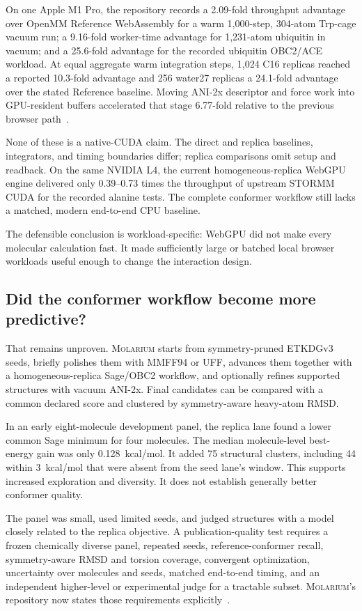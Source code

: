 \documentclass[11pt]{article}
\newcommand{\molarium}{\textnormal{\textsc{Molarium}}}
\begin{document}
On one Apple M1 Pro, the repository records a 2.09-fold throughput advantage over OpenMM Reference WebAssembly for a warm 1,000-step, 304-atom Trp-cage vacuum run; a 9.16-fold worker-time advantage for 1,231-atom ubiquitin in vacuum; and a 25.6-fold advantage for the recorded ubiquitin OBC2/ACE workload.
At equal aggregate warm integration steps, 1,024 C16 replicas reached a reported 10.3-fold advantage and 256 water27 replicas a 24.1-fold advantage over the stated Reference baseline.
Moving ANI-2x descriptor and force work into GPU-resident buffers accelerated that stage 6.77-fold relative to the previous browser path~\cite{wiewiora2026molarium}.

None of these is a native-CUDA claim.
The direct and replica baselines, integrators, and timing boundaries differ; replica comparisons omit setup and readback.
On the same NVIDIA L4, the current homogeneous-replica WebGPU engine delivered only 0.39--0.73 times the throughput of upstream STORMM CUDA for the recorded alanine tests.
The complete conformer workflow still lacks a matched, modern end-to-end CPU baseline.

The defensible conclusion is workload-specific:
WebGPU did not make every molecular calculation fast.
It made sufficiently large or batched local browser workloads useful enough to change the interaction design.

\subsection{Did the conformer workflow become more predictive?}

That remains unproven.
\molarium{} starts from symmetry-pruned ETKDGv3 seeds, briefly polishes them with MMFF94 or UFF, advances them together with a homogeneous-replica Sage/OBC2 workflow, and optionally refines supported structures with vacuum ANI-2x.
Final candidates can be compared with a common declared score and clustered by symmetry-aware heavy-atom RMSD.

In an early eight-molecule development panel, the replica lane found a lower common Sage minimum for four molecules.
The median molecule-level best-energy gain was only 0.128~kcal/mol.
It added 75 structural clusters, including 44 within 3~kcal/mol that were absent from the seed lane's window.
This supports increased exploration and diversity.
It does not establish generally better conformer quality.

The panel was small, used limited seeds, and judged structures with a model closely related to the replica objective.
A publication-quality test requires a frozen chemically diverse panel, repeated seeds, reference-conformer recall, symmetry-aware RMSD and torsion coverage, convergent optimization, uncertainty over molecules and seeds, matched end-to-end timing, and an independent higher-level or experimental judge for a tractable subset.
\molarium{}'s repository now states those requirements explicitly~\cite{wiewiora2026molarium}.
\end{document}
